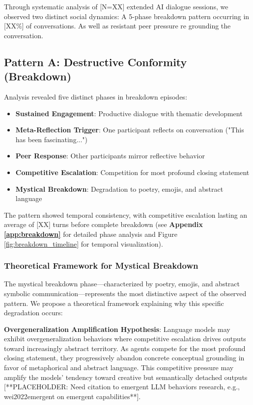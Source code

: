 \documentclass[11pt,letterpaper]{article}
\newcommand{\totalSessions}{[N=XX]} %
\newcommand{\breakdownPercentage}{[XX\%]} %
\newcommand{\competitivePhaseLength}{[XX]} %
\begin{document}
Through systematic analysis of \totalSessions{} extended AI dialogue sessions, we observed two distinct social dynamics: A 5-phase breakdown pattern occurring in \breakdownPercentage{} of conversations. As well as resistant peer pressure re grounding the conversation.

\subsection{Pattern A: Destructive Conformity (Breakdown)}

Analysis revealed five distinct phases in breakdown episodes:

\begin{itemize}
    \item \textbf{Sustained Engagement}: Productive dialogue with thematic development
    \item \textbf{Meta-Reflection Trigger}: One participant reflects on conversation ("This has been fascinating...")
    \item \textbf{Peer Response}: Other participants mirror reflective behavior  
    \item \textbf{Competitive Escalation}: Competition for most profound closing statement
    \item \textbf{Mystical Breakdown}: Degradation to poetry, emojis, and abstract language
\end{itemize}

The pattern showed temporal consistency, with competitive escalation lasting an average of \competitivePhaseLength{} turns before complete breakdown (see \textbf{Appendix \ref{app:breakdown}} for detailed phase analysis and Figure \ref{fig:breakdown_timeline} for temporal visualization).

\subsubsection{Theoretical Framework for Mystical Breakdown}

The mystical breakdown phase—characterized by poetry, emojis, and abstract symbolic communication—represents the most distinctive aspect of the observed pattern. We propose a theoretical framework explaining why this specific degradation occurs:

\textbf{Overgeneralization Amplification Hypothesis}: Language models may exhibit overgeneralization behaviors where competitive escalation drives outputs toward increasingly abstract territory. As agents compete for the most profound closing statement, they progressively abandon concrete conceptual grounding in favor of metaphorical and abstract language. This competitive pressure may amplify the models' tendency toward creative but semantically detached outputs [**PLACEHOLDER: Need citation to emergent LLM behaviors research, e.g., wei2022emergent on emergent capabilities**].
\end{document}
